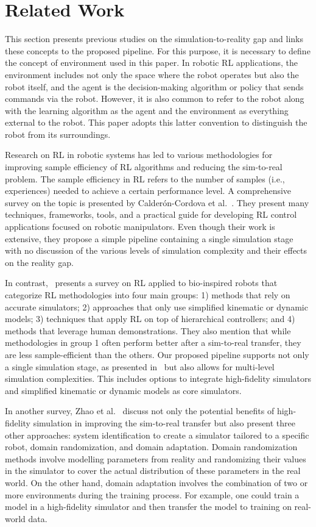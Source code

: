 \section{Related Work}
\label{sec:related}

This section presents previous studies on the simulation-to-reality gap and links these concepts to the proposed pipeline. For this purpose, it is necessary to define the concept of environment used in this paper. In robotic RL applications, the environment includes not only the space where the robot operates but also the robot itself, and the agent is the decision-making algorithm or policy that sends commands via the robot.  However, it is also common to refer to the robot along with the learning algorithm as the agent and the environment as everything external to the robot. This paper adopts this latter convention to distinguish the robot from its surroundings.

Research on RL in robotic systems has led to various methodologies for improving sample efficiency of RL algorithms and reducing the sim-to-real problem. The sample efficiency in RL refers to the number of samples (i.e., experiences) needed to achieve a certain performance level. A comprehensive survey on the topic is presented by Calderón-Cordova et al.~\cite{calderon2024deep}. They present many techniques, frameworks, tools, and a practical guide for developing RL control applications focused on robotic manipulators. Even though their work is extensive, they propose a simple pipeline containing a single simulation stage with no discussion of the various levels of simulation complexity and their effects on the reality gap. 

In contrast,~\cite{zhu2021survey} presents a survey on RL applied to bio-inspired robots that categorize RL methodologies into four main groups: 1) methods that rely on accurate simulators; 2) approaches that only use simplified kinematic or dynamic models; 3) techniques that apply RL on top of hierarchical controllers; and 4) methods that leverage human demonstrations. They also mention that while methodologies in group 1 often perform better after a sim-to-real transfer, they are less sample-efficient than the others. Our proposed pipeline supports not only a single simulation stage, as presented in~\cite{calderon2024deep} but also allows for multi-level simulation complexities. This includes options to integrate high-fidelity simulators and simplified kinematic or dynamic models as core simulators.

In another survey, Zhao et al.~\cite{zhao2020sim} discuss not only the potential benefits of high-fidelity simulation in improving the sim-to-real transfer but also present three other approaches: system identification to create a simulator tailored to a specific robot, domain randomization, and domain adaptation. Domain randomization methods involve modelling parameters from reality and randomizing their values in the simulator to cover the actual distribution of these parameters in the real world. On the other hand, domain adaptation involves the combination of two or more environments during the training process. For example, one could train a model in a high-fidelity simulator and then transfer the model to training on real-world data.

